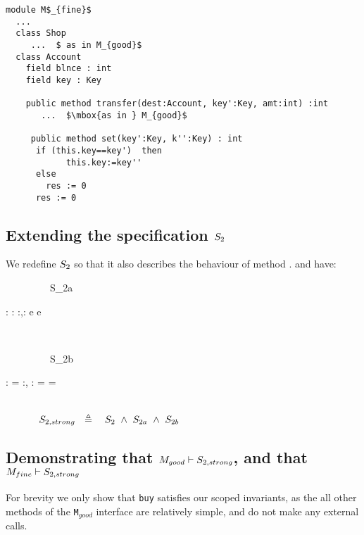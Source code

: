 \begin{lstlisting}[mathescape=true, language=Chainmail, frame=lines]
module M$_{fine}$
  ...   
  class Shop
     ...  $ as in M_{good}$
  class Account
    field blnce : int 
    field key : Key
    
    public method transfer(dest:Account, key':Key, amt:int) :int
       ...  $\mbox{as in } M_{good}$
	  
     public method set(key':Key, k'':Key) : int
      if (this.key==key')  then
      		this.key:=key''
      else 
        res := 0
      res := 0
\end{lstlisting}

\subsection{Extending the specification $S_2$}
\label{s:extend:spec}

We redefine $S_2$ so that it also describes the behaviour of method . and have:

{\sprepost
		{\strut \ \ \ \ \ \ \ \ \ S_{2a}} 
		{ : \wedge  {}:  \wedge {} { } } %
		 {}
		 {}
		 {:,: }
		 {  {e} }
		 {  {e} }
}
\\
{\sprepost
		{\strut \ \ \ \ \ \ \ \ \ S_{2b}} 
		{ : \wedge {} = }
		 {}
		 {}
		 {:, : }
		 {  = }
		{    = }
}
\\
$\strut  \SPSP  \STwoStrong \ \  \triangleq \ \ \ \STwo \ \wedge \ S_{2a} \ \wedge \ S_{2b} $

 


\subsection{Demonstrating that $M_{good} \vdash S_{2,strong}$, and that $M_{fine} \vdash S_{2,strong}$}
 \label{s:app:example:proofs}
 
For brevity we only show that \verb|buy| satisfies our scoped invariants, as the all other methods of 
the \verb|M|$_{good}$ interface are relatively simple, and do not make any external calls. 

